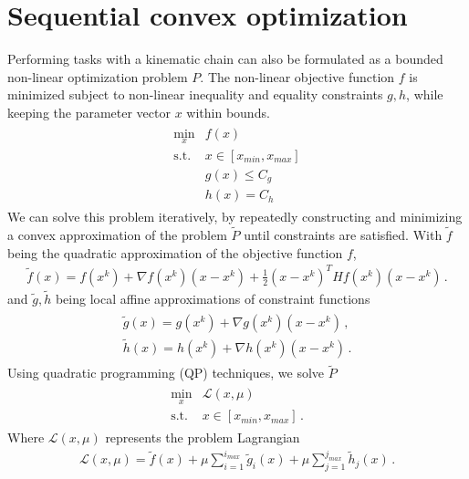 \documentclass[times, utf8, diplomski, english]{fer}
\begin{document}
\section{Sequential convex optimization}\label{section:sqp}
Performing tasks with a kinematic chain can also be formulated as a bounded non-linear optimization problem $P$. 
The non-linear objective function $f$ is minimized subject to non-linear inequality and equality constraints $g , h$, while keeping the parameter vector $x$ within bounds. 
\begin{align}
\label{optik_1}
\begin{array}{rl}
\min\limits_{x} & f(x) \\
\mbox{s.t.} & x \in \left[x_{min}, x_{max}\right] \\
  & g(x) \le C_{g} \\
  & h(x) = C_{h}
\end{array}
\end{align}
We can solve this problem iteratively, by repeatedly constructing and minimizing a convex approximation of the problem $\tilde{P}$ until constraints are satisfied. With $\tilde{f}$ being the quadratic approximation of the objective function $f$,
\begin{align}
\label{optik_2}
\tilde{f}\left(x\right) = f\left(x^k\right) + \nabla f\left(x^k\right)\left(x - x^k\right) + \frac{1}{2}\left(x - x^k\right)^T Hf\left(x^k\right)\left(x - x^k\right)\, .
\end{align}
 and $\tilde{g}, \tilde{h}$ being local affine approximations of constraint functions
 \begin{eqnarray}
 \begin{split}
 \label{optik_3}
\tilde{g}\left(x\right) = g\left(x^k\right) + \nabla g\left(x^k\right)\left(x - x^k\right)\, , \\
\tilde{h}\left(x\right) = h\left(x^k\right) + \nabla h\left(x^k\right)\left(x - x^k\right)\, . 
\end{split}
\end{eqnarray}
Using quadratic programming (QP) techniques, we solve $\tilde{P}$
\begin{align}
\label{optik_4}
 \begin{array}{rl}
\min\limits_{x} & \mathcal{L}\left(x,\mu\right)\\
\mbox{s.t.} & x \in \left[x_{min}, x_{max}\right]\, .
\end{array}
\end{align}
Where $\mathcal{L}\left(x,\mu\right)$ represents the problem Lagrangian
\begin{align}
\label{optik_5}
\mathcal{L}(x,\mu) = \tilde{f}\left(x\right) + \mu\sum\limits_{i = 1}^{i_{max}}{\tilde{g}_{i}\left(x\right)}
+ \mu\sum\limits_{j = 1}^{j_{max}}{\tilde{h}_{j}\left(x\right)}\, .
\end{align}
\end{document}

